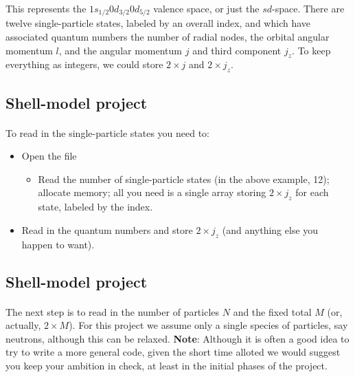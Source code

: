 \noindent
This represents the $1s_{1/2}0d_{3/2}0d_{5/2}$ valence space, or just the $sd$-space.  There are 
twelve single-particle states, labeled by an overall index, and which have associated quantum 
numbers the number of radial nodes, the orbital angular momentum $l$, and the 
angular momentum $j$ and third component $j_z$.  To keep everything as integers, we could store $2 \times j$ and 
$2 \times j_z$.



\subsection*{Shell-model project}

\paragraph{}
To read in the single-particle states you need to:
\begin{itemize}
\item Open the file 
\begin{itemize}

 \item Read the number of single-particle states (in the above example, 12);  allocate memory; all you need is a single array storing $2\times j_z$ for each state, labeled by the index.

\end{itemize}

\noindent
\item Read in the quantum numbers and store $2 \times j_z$ (and anything else you happen to want).
\end{itemize}

\noindent



\subsection*{Shell-model project}

\paragraph{}

The next step is to read in the number of particles $N$ and the fixed total $M$ (or, actually, $2 \times M$). 
For this project we assume only a single species of particles, say neutrons, although this can be 
relaxed. \textbf{Note}: Although it is often a good idea to try to write a more general code, given the 
short time alloted we would suggest you keep your ambition in check, at least in the initial phases of the 
project.  

